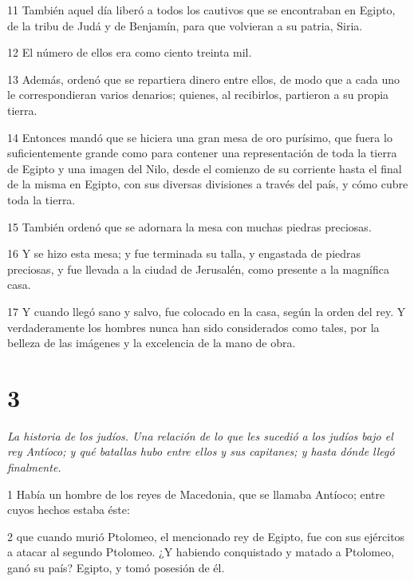 \par 11 También aquel día liberó a todos los cautivos que se encontraban en Egipto, de la tribu de Judá y de Benjamín, para que volvieran a su patria, Siria.

\par 12 El número de ellos era como ciento treinta mil.

\par 13 Además, ordenó que se repartiera dinero entre ellos, de modo que a cada uno le correspondieran varios denarios; quienes, al recibirlos, partieron a su propia tierra.

\par 14 Entonces mandó que se hiciera una gran mesa de oro purísimo, que fuera lo suficientemente grande como para contener una representación de toda la tierra de Egipto y una imagen del Nilo, desde el comienzo de su corriente hasta el final de la misma en Egipto, con sus diversas divisiones a través del país, y cómo cubre toda la tierra.

\par 15 También ordenó que se adornara la mesa con muchas piedras preciosas.

\par 16 Y se hizo esta mesa; y fue terminada su talla, y engastada de piedras preciosas, y fue llevada a la ciudad de Jerusalén, como presente a la magnífica casa.

\par 17 Y cuando llegó sano y salvo, fue colocado en la casa, según la orden del rey. Y verdaderamente los hombres nunca han sido considerados como tales, por la belleza de las imágenes y la excelencia de la mano de obra.

\chapter{3}

\par \textit{La historia de los judíos. Una relación de lo que les sucedió a los judíos bajo el rey Antíoco; y qué batallas hubo entre ellos y sus capitanes; y hasta dónde llegó finalmente.}

\par 1 Había un hombre de los reyes de Macedonia, que se llamaba Antíoco; entre cuyos hechos estaba éste:

\par 2 que cuando murió Ptolomeo, el mencionado rey de Egipto, fue con sus ejércitos a atacar al segundo Ptolomeo. ¿Y habiendo conquistado y matado a Ptolomeo, ganó su país? Egipto, y tomó posesión de él.

